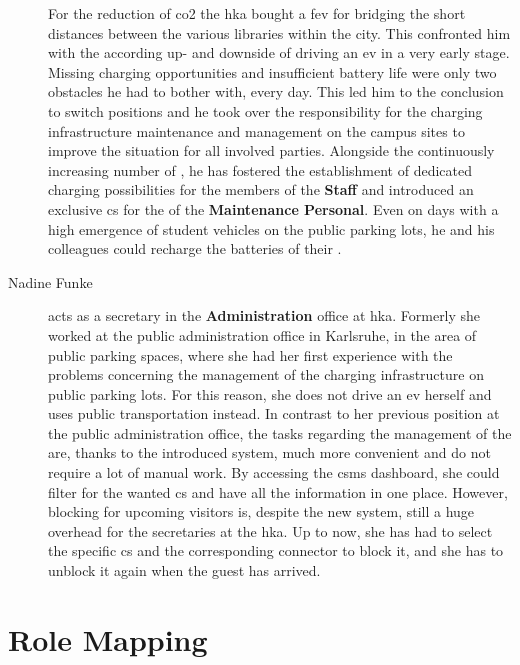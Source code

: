 \begin{description}
    For the reduction of \acrshort{co2} the \acrshort{hka} bought a \acrshort{fev} for bridging the short distances between the various libraries within the city.
    This confronted him with the according up- and downside of driving an \acrshort{ev} in a very early stage.
    Missing charging opportunities and insufficient battery life were only two obstacles he had to bother with, every day.
    This led him to the conclusion to switch positions and he took over the responsibility for the charging infrastructure maintenance and management on the campus sites to improve the situation for all involved parties.
    Alongside the continuously increasing number of , he has fostered the establishment of dedicated charging possibilities for the members of the \textbf{Staff} and introduced an exclusive \acrshort{cs} for the  of the \textbf{Maintenance Personal}.
    Even on days with a high emergence of student vehicles on the public parking lots, he and his colleagues could recharge the batteries of their .
    \newpage
    \item[Nadine Funke] acts as a secretary in the \textbf{Administration} office at \acrshort{hka}. Formerly she worked at the public administration office in Karlsruhe, in the area of public parking spaces, where she had her first experience with the problems concerning the management of the charging infrastructure on public parking lots.
    For this reason, she does not drive an \acrshort{ev} herself and uses public transportation instead. In contrast to her previous position at the public administration office, the tasks regarding the management of the  are, thanks to the introduced system, much more convenient and do not require a lot of manual work.
    By accessing the \acrshort{csms} dashboard, she could filter for the wanted \acrshort{cs} and have all the information in one place.
    However, blocking  for upcoming visitors is, despite the new system, still a huge overhead for the secretaries at the \acrshort{hka}.
    Up to now, she has had to select the specific \acrshort{cs} and the corresponding connector to block it, and she has to unblock it again when the guest has arrived.
\end{description}

\section{Role Mapping}
\label{ch:Requirements Engineering:sec:Role Mapping}

